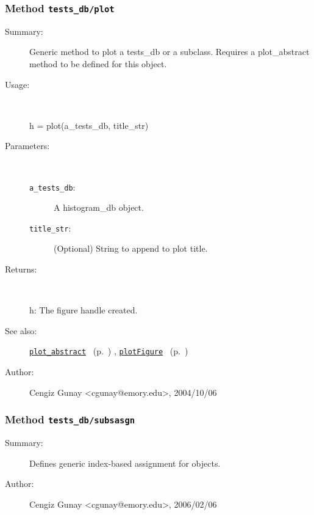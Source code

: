 \subsubsection[Method \texttt{plot}]{Method \texttt{tests\_db/plot}}%
%
\label{ref_tests_db__plot}%
\hypertarget{ref_tests_db__plot}{}%
\begin{description}
\item[Summary:]Generic method to plot a tests\_db or a subclass. Requires a 
	plot\_abstract method to be defined for this object.
%
\item[Usage:]~%
\begin{lyxcode}%
h = plot(a\_tests\_db, title\_str)
%
\end{lyxcode}%
%
%
\item[Parameters:]~
\begin{description}%
\item[\texttt{a\_tests\_db}:]
 A histogram\_db object.
\item[\texttt{title\_str}:]
 (Optional) String to append to plot title.
\end{description}%
%
\item[Returns:]~

	h: The figure handle created.
%
%
\item[See also:]%
\hyperlink{ref_plot_abstract}{\texttt{plot\_abstract}}%
\ (p.~\pageref{ref_plot_abstract})%
%
, \hyperlink{ref_plotFigure}{\texttt{plotFigure}}%
\ (p.~\pageref{ref_plotFigure})%
%
%
\item[Author:]%
Cengiz Gunay <cgunay@emory.edu>, 2004/10/06%
\end{description}
\methodline%
\subsubsection[Method \texttt{subsasgn}]{Method \texttt{tests\_db/subsasgn}}%
%
\label{ref_tests_db__subsasgn}%
\hypertarget{ref_tests_db__subsasgn}{}%
\begin{description}
\item[Summary:]Defines generic index-based assignment for objects.
%
%
%
%
%
%
%
\item[Author:]%
Cengiz Gunay <cgunay@emory.edu>, 2006/02/06%
\end{description}
\methodline%
